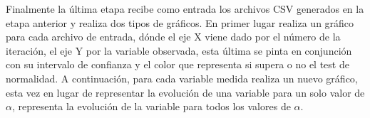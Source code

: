 \documentclass[../proyecto.tex]{memoir}
\begin{document}
Finalmente la última etapa recibe como entrada los archivos CSV generados en la etapa anterior y realiza dos tipos de gráficos. En primer lugar realiza un gráfico para cada archivo de entrada, dónde el eje X viene dado por el número de la iteración, el eje Y por la variable observada, esta última se pinta en conjunción con su intervalo de confianza y el color que representa si supera o no el test de normalidad. A continuación, para cada variable medida realiza un nuevo gráfico, esta vez en lugar de representar la evolución de una variable para un solo valor de $\alpha$, representa la evolución de la variable para todos los valores de $\alpha$. 

\end{document}
